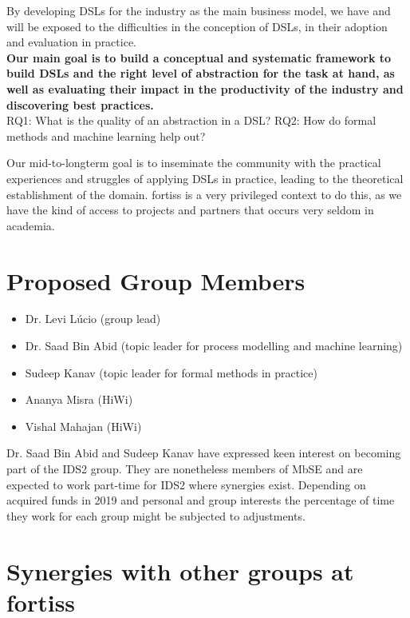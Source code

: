 \documentclass{article}
\begin{document}
By developing DSLs for the industry as the main business model, we have and will
be exposed to the difficulties in the conception of DSLs, in their adoption and
evaluation in practice.\\

\textbf{Our main goal is to build a conceptual and systematic framework to build
DSLs and the right level of abstraction for the task at hand, as well as
evaluating their impact in the productivity of the industry and
discovering best practices.}\\

RQ1: What is the quality of an abstraction in a DSL?
RQ2: How do formal methods and machine learning help out?

Our mid-to-longterm goal is to inseminate the community with the practical
experiences and struggles of applying DSLs in practice, leading to the
theoretical establishment of the domain. fortiss is a very privileged context to
do this, as we have the kind of access to projects and partners that occurs very
seldom in academia. 

\section{Proposed Group Members}

\begin{itemize}
  \item Dr. Levi L\'ucio (group lead)
  \item Dr. Saad Bin Abid (topic leader for process modelling and machine
  learning)
  \item Sudeep Kanav (topic leader for formal methods in practice)
  \item Ananya Misra (HiWi)
  \item Vishal Mahajan (HiWi)
\end{itemize}

Dr. Saad Bin Abid and Sudeep Kanav have expressed keen interest on becoming part
of the IDS2 group. They are nonetheless members of MbSE and are
expected to work part-time for IDS2 where synergies exist. Depending on acquired
funds in 2019 and personal and group interests the percentage of time they work
for each group might be subjected to adjustments.

\section{Synergies with other groups at fortiss}
\end{document}
